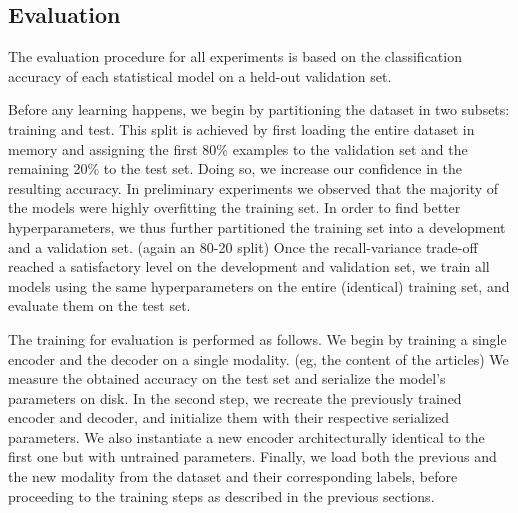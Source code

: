 \documentclass[12pt]{article}
\begin{document}


\subsection{Evaluation}
The evaluation procedure for all experiments is based on the classification accuracy of each statistical model on a held-out validation set.

Before any learning happens, we begin by partitioning the dataset in two subsets: training and test. This split is achieved by first loading the entire dataset in memory and assigning the first 80\% examples to the validation set and the remaining 20\% to the test set. Doing so, we increase our confidence in the resulting accuracy. In preliminary experiments we observed that the majority of the models were highly overfitting the training set. In order to find better hyperparameters, we thus further partitioned the training set into a development and a validation set. (again an 80-20 split) Once the recall-variance trade-off reached a satisfactory level on the development and validation set, we train all models using the same hyperparameters on the entire (identical) training set, and evaluate them on the test set.

The training for evaluation is performed as follows. We begin by training a single encoder and the decoder on a single modality.
(eg, the content of the articles) We measure the obtained accuracy on the test set and serialize the model's parameters on disk. In the second step, we recreate the previously trained encoder and decoder, and initialize them with their respective serialized parameters. We also instantiate a new encoder architecturally identical to the first one but with untrained parameters. Finally, we load both the previous and the new modality from the dataset and their corresponding labels, before proceeding to the training steps as described in the previous sections.
 
\end{document}
